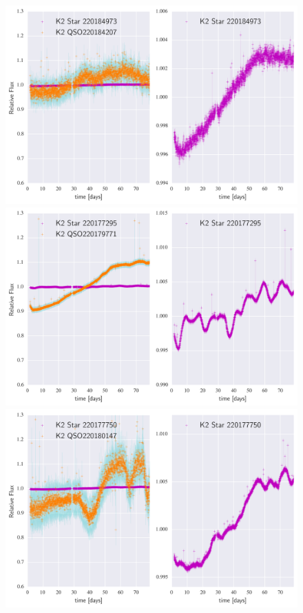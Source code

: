 \documentclass[a4paper,fleqn,usenatbib]{mnras}
\begin{document}
       \begin{figure}
 	\includegraphics[width=\columnwidth]{220184207NearestNeighbor.png}
 	\includegraphics[width=\columnwidth]{220179771NearestNeighbor.png}
 	\includegraphics[width=\columnwidth]{220180147NearestNeighbor.png}
       	\caption{}
       	\label{fig:example_figure}
       \end{figure}
\end{document}
